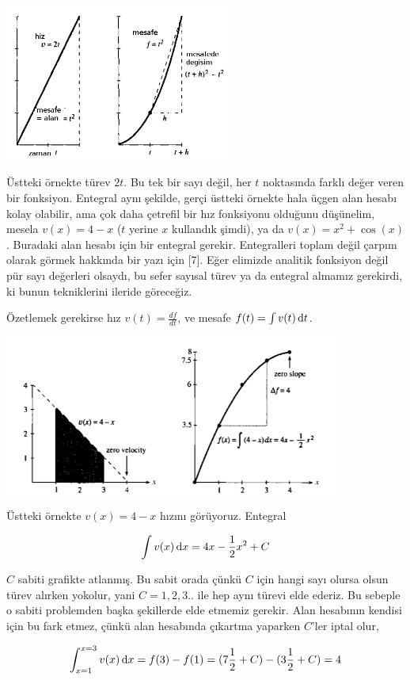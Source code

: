 \documentclass[12pt,fleqn]{article}\usepackage{../../common}
\begin{document}
\includegraphics[width=20em]{phy_005_basics_03.png}

Üstteki örnekte türev $2t$. Bu tek bir sayı değil, her $t$ noktasında
farklı değer veren bir fonksiyon. Entegral aynı şekilde, gerçi üstteki
örnekte hala üçgen alan hesabı kolay olabilir, ama çok daha çetrefil bir
hız fonksiyonu olduğunu düşünelim, mesela $v(x) = 4 - x$ ($t$ yerine $x$
kullandık şimdi), ya da $v(x) = x^2 + \cos(x)$. Buradaki alan hesabı için
bir entegral gerekir. Entegralleri toplam değil çarpım olarak görmek
hakkında bir yazı için [7]. Eğer elimizde analitik fonksiyon değil pür sayı
değerleri olsaydı, bu sefer sayısal türev ya da entegral almamız gerekirdi,
ki bunun tekniklerini ileride göreceğiz.

Özetlemek gerekirse hız $v(t) = \frac{df}{dt}$, ve mesafe $f(t) = \int v(t)\,\mathrm{d} t$.

\includegraphics[width=30em]{phy_005_basics_04.png}

Üstteki örnekte $v(x) = 4 - x$ hızını görüyoruz. Entegral 

$$ \int v(x) \,\mathrm{d} x = 4x - \frac{1}{2}x^2 + C $$

$C$ sabiti grafikte atlanmış. Bu sabit orada çünkü $C$ için hangi sayı
olursa olsun türev alırken yokolur, yani $C=1,2,3..$ ile hep aynı türevi
elde ederiz. Bu sebeple o sabiti problemden başka şekillerde elde etmemiz
gerekir. Alan hesabının kendisi için bu fark etmez, çünkü alan hesabında
çıkartma yaparken $C$'ler iptal olur, 

$$ 
\int _{x=1}^{x=3} v(x) \,\mathrm{d} x = f(3) - f(1) = 
(7 \frac{1}{2} + C) - (3 \frac{1}{2} + C) = 4
$$
\end{document}
